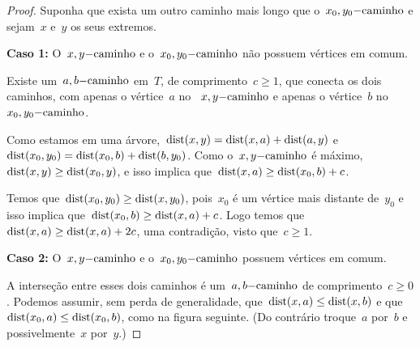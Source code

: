 	\begin{proof}
		Suponha que exista um outro caminho mais longo que 
		o~$x_0,y_0\mathrm{-caminho}$ e sejam~$x$ e~$y$ os seus extremos.

	        \textbf{Caso 1:} O~$x,y\mathrm{-caminho}$ e 
	        o~$x_0,y_0\mathrm{-caminho}$ não possuem vértices em comum.

	        Existe um~$a,b\mathrm{-caminho}$ em~$T$, de 
	        comprimento~$c \ge 1$, que conecta os dois caminhos, 
	        com apenas o vértice~$a$ 
	        no ~$x,y\mathrm{-caminho}$ e apenas o vértice~$b$ 
	        no~$x_0,y_0\mathrm{-caminho}$.

	        \begin{center}  \end{center}


	        Como estamos em uma 
	        árvore,~${\mathrm{dist}(x,y) =\mathrm{dist}(x,a)+\mathrm{dist}(a,y)}$
	        e~${\mathrm{dist}(x_0,y_0) =\mathrm{dist}(x_0,b)+\mathrm{dist}(b,y_0)}$.
	        Como o~$x,y\mathrm{-caminho}$ é 
	        máximo,~${\mathrm{dist}(x,y)\ge \mathrm{dist}(x_0,y)}$,
	        e isso implica que~${\mathrm{dist}(x,a)\ge \mathrm{dist}(x_0,b)+c}$.
 			
 			Temos que~${\mathrm{dist}(x_0,y_0)\ge \mathrm{dist}(x,y_0)}$,
	        pois~$x_0$ é um vértice mais distante de~$y_0$ e isso implica 
	        que~${\mathrm{dist}(x_0,b)\ge \mathrm{dist}(x,a)+c}$.
	        Logo temos 
	        que~${\mathrm{dist}(x,a)\ge \mathrm{dist}(x, a)+2c}$,
	        uma contradição, visto que~${c\ge 1}$.


			\bigskip
			\bigskip
			\bigskip


			\textbf{Caso 2:} O~$x,y\mathrm{-caminho}$ e 
			o~$x_0,y_0\mathrm{-caminho}$ possuem vértices em comum.

			A interseção entre esses dois caminhos é 
			um~$a,b\mathrm{-caminho}$ de comprimento~$c \ge 0$.
			Podemos assumir, sem perda de generalidade, 
			que~${\mathrm{dist}(x,a) \le \mathrm{dist}(x,b)}$ e 
			que~${\mathrm{dist}(x_0,a) \le \mathrm{dist}(x_0,b)}$, como na figura 
			seguinte.
			(Do contrário troque~$a$ por~$b$ e possivelmente~$x$
			por~$y$.)


\end{proof}
